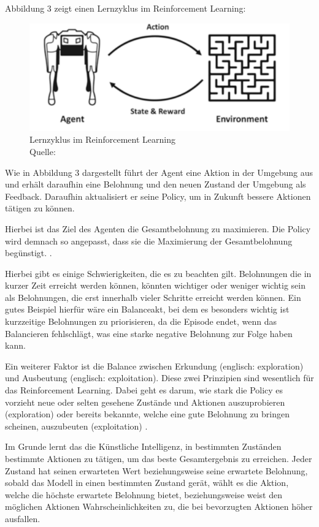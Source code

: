 	Abbildung 3 zeigt einen Lernzyklus im Reinforcement Learning:
\nopagebreak
\begin{figure}[H]
\includegraphics[width=1\textwidth]{Bilder/rl} 
\caption[Lernzyklus im Reinforcement Learning]{Lernzyklus im Reinforcement Learning\\ Quelle: \cite{ris-ala_fundamentals_2023}}
\end{figure}

Wie in Abbildung 3 dargestellt führt der Agent eine Aktion in der Umgebung aus und erhält daraufhin eine Belohnung und den neuen Zustand der Umgebung als Feedback. Daraufhin aktualisiert er seine Policy, um in Zukunft bessere Aktionen tätigen zu können.

Hierbei ist das Ziel des Agenten die Gesamtbelohnung zu maximieren. Die Policy wird demnach so angepasst, dass sie die Maximierung der Gesamtbelohnung begünstigt. \cite[S. 12f]{ris-ala_fundamentals_2023}.

Hierbei gibt es einige Schwierigkeiten, die es zu beachten gilt. Belohnungen die in kurzer Zeit erreicht werden können, könnten wichtiger oder weniger wichtig sein als Belohnungen, die erst innerhalb vieler Schritte erreicht werden können. Ein gutes Beispiel hierfür wäre ein Balanceakt, bei dem es besonders wichtig ist kurzzeitige Belohnungen zu priorisieren, da die Episode endet, wenn das Balancieren fehlschlägt, was eine starke negative Belohnung zur Folge haben kann.

Ein weiterer Faktor ist die Balance zwischen Erkundung (englisch: exploration) und Ausbeutung (englisch: exploitation). Diese zwei Prinzipien sind wesentlich für das Reinforcement Learning. Dabei geht es darum, wie stark die Policy es vorzieht neue oder selten gesehene Zustände und Aktionen auszuprobieren (exploration) oder bereits bekannte, welche eine gute Belohnung zu bringen scheinen, auszubeuten (exploitation) \cite[S. 13]{ris-ala_fundamentals_2023}.

Im Grunde lernt das die Künstliche Intelligenz, in bestimmten Zuständen bestimmte Aktionen zu tätigen, um das beste Gesamtergebnis zu erreichen. Jeder Zustand hat seinen erwarteten Wert beziehungsweise seine erwartete Belohnung, sobald das Modell in einen bestimmten Zustand gerät, wählt es die Aktion, welche die höchste erwartete Belohnung bietet, beziehungsweise weist den möglichen Aktionen Wahrscheinlichkeiten zu, die bei bevorzugten Aktionen höher ausfallen.\\

